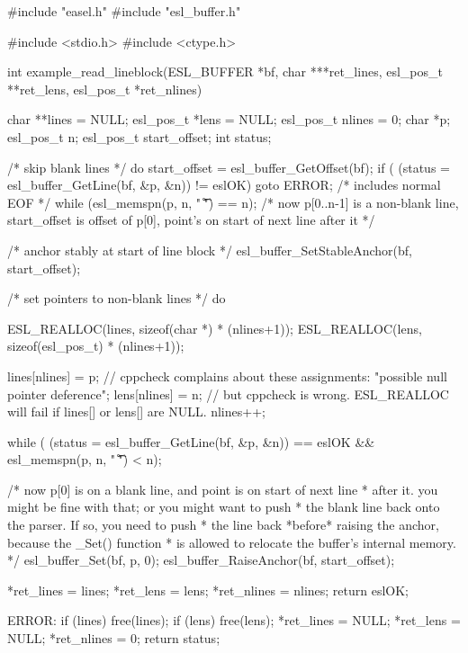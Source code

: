 \begin{cchunk}
#include "easel.h"
#include "esl_buffer.h"

#include <stdio.h>
#include <ctype.h>

int
example_read_lineblock(ESL_BUFFER *bf, char ***ret_lines, esl_pos_t **ret_lens, esl_pos_t *ret_nlines)
{
  char      **lines  = NULL;
  esl_pos_t  *lens   = NULL;
  esl_pos_t   nlines = 0;
  char       *p;
  esl_pos_t   n;
  esl_pos_t   start_offset;
  int         status;

  /* skip blank lines */
  do {
    start_offset = esl_buffer_GetOffset(bf);
    if ( (status = esl_buffer_GetLine(bf, &p, &n)) != eslOK) goto ERROR; /* includes normal EOF */
  } while (esl_memspn(p, n, " \t\r\n") == n);
  /* now p[0..n-1] is a non-blank line, start_offset is offset of p[0], point's on start of next line after it */
  
  /* anchor stably at start of line block */
  esl_buffer_SetStableAnchor(bf, start_offset);

  /* set pointers to non-blank lines */
  do {
    ESL_REALLOC(lines, sizeof(char *)    * (nlines+1));
    ESL_REALLOC(lens,  sizeof(esl_pos_t) * (nlines+1));
    
    lines[nlines] = p;   // cppcheck complains about these assignments: "possible null pointer deference";
    lens[nlines]  = n;   // but cppcheck is wrong. ESL_REALLOC will fail if lines[] or lens[] are NULL.
    nlines++;
  } while ( (status = esl_buffer_GetLine(bf, &p, &n)) == eslOK && esl_memspn(p, n, " \t\r\n") < n);
  
  /* now p[0] is on a blank line, and point is on start of next line
   * after it.  you might be fine with that; or you might want to push
   * the blank line back onto the parser. If so, you need to push
   * the line back *before* raising the anchor, because the _Set() function
   * is allowed to relocate the buffer's internal memory.
   */
  esl_buffer_Set(bf, p, 0);
  esl_buffer_RaiseAnchor(bf, start_offset);

  *ret_lines  = lines;
  *ret_lens   = lens;
  *ret_nlines = nlines;
  return eslOK;

 ERROR:
  if (lines) free(lines);
  if (lens)  free(lens);
  *ret_lines  = NULL;
  *ret_lens   = NULL;
  *ret_nlines = 0;
  return status;
}
\end{cchunk}
